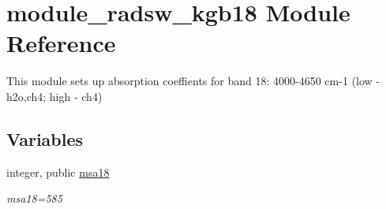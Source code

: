 \hypertarget{namespacemodule__radsw__kgb18}{}\section{module\+\_\+radsw\+\_\+kgb18 Module Reference}
\label{namespacemodule__radsw__kgb18}


This module sets up absorption coeffients for band 18\+: 4000-\/4650 cm-\/1 (low -\/ h2o,ch4; high -\/ ch4)  


\subsection*{Variables}
\begin{DoxyCompactItemize}
\item 
\mbox{\label{namespacemodule__radsw__kgb18_a48213008c9ed8f94aaad4ef327d38583}} 
integer, public \hyperlink{namespacemodule__radsw__kgb18_a48213008c9ed8f94aaad4ef327d38583}{msa18}
\begin{DoxyCompactList}\small\item\em msa18=585 \end{DoxyCompactList}\end{DoxyCompactItemize}
